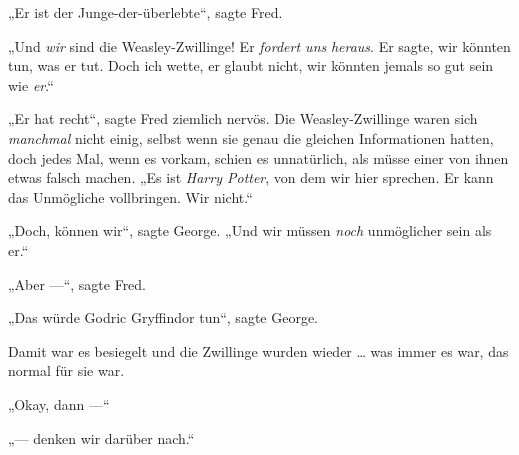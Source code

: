 „Er ist der Junge-der-überlebte“, sagte Fred.

„Und \emph{wir} sind die Weasley-Zwillinge! Er \emph{fordert uns} \emph{heraus}. Er sagte, wir könnten tun, was er tut. Doch ich wette, er glaubt nicht, wir könnten jemals so gut sein wie \emph{er}.“

„Er hat recht“, sagte Fred ziemlich nervös. Die Weasley-Zwillinge waren sich \emph{manchmal} nicht einig, selbst wenn sie genau die gleichen Informationen hatten, doch jedes Mal, wenn es vorkam, schien es unnatürlich, als müsse einer von ihnen etwas falsch machen.
„Es ist \emph{Harry Potter}, von dem wir hier sprechen. Er kann das Unmögliche vollbringen. Wir nicht.“

„Doch, können wir“, sagte George.
„Und wir müssen \emph{noch} unmöglicher sein als er.“

„Aber —“, sagte Fred.

„Das würde Godric Gryffindor tun“, sagte George.

Damit war es besiegelt und die Zwillinge wurden wieder … was immer es war, das normal für sie war.

„Okay, dann —“

„— denken wir darüber nach.“

